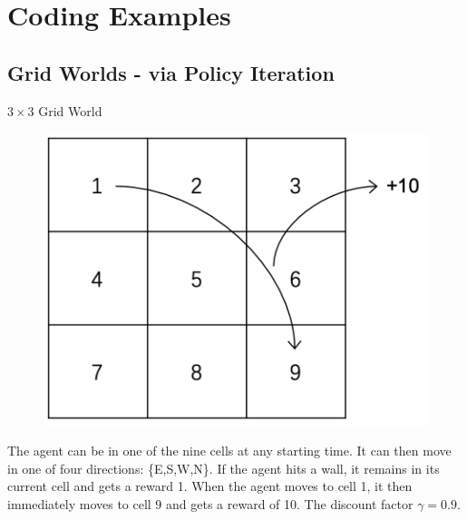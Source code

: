\documentclass{beamer}
\begin{document}
%		
%
%
%


\section{Coding Examples}

\subsection{Grid Worlds - via Policy Iteration}

\begin{frame}{$3 \times 3$ Grid World}
\begin{figure}[htpb]
    \centering
    \includegraphics[width=0.4\linewidth]{pic/33grid.png}
\end{figure}

The agent can be in one of the nine cells at any starting time. It can then move in one of four directions: \{E,S,W,N\}. If the agent hits a wall, it remains in its current cell and gets a reward 1. When the agent moves to cell 1, it then immediately moves to cell 9 and gets a reward of 10. The discount factor $\gamma = 0.9$.
\end{frame}
\end{document}
